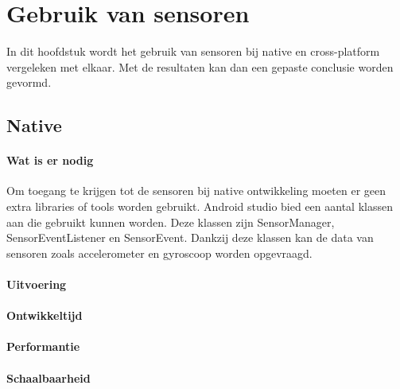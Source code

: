 
\chapter{Gebruik van sensoren}%
\label{ch:sensoren}

In dit hoofdstuk wordt het gebruik van sensoren bij native en cross-platform vergeleken met elkaar. 
Met de resultaten kan dan een gepaste conclusie worden gevormd.

\section{Native}
\subsubsection{Wat is er nodig}
Om toegang te krijgen tot de sensoren bij native ontwikkeling moeten er geen extra libraries of tools worden gebruikt.
Android studio bied een aantal klassen aan die gebruikt kunnen worden. Deze klassen zijn SensorManager, 
SensorEventListener en SensorEvent. Dankzij deze klassen kan de data van sensoren zoals accelerometer en 
gyroscoop worden opgevraagd.

\subsubsection{Uitvoering}



\subsubsection{Ontwikkeltijd}



\subsubsection{Performantie}



\subsubsection{Schaalbaarheid}

